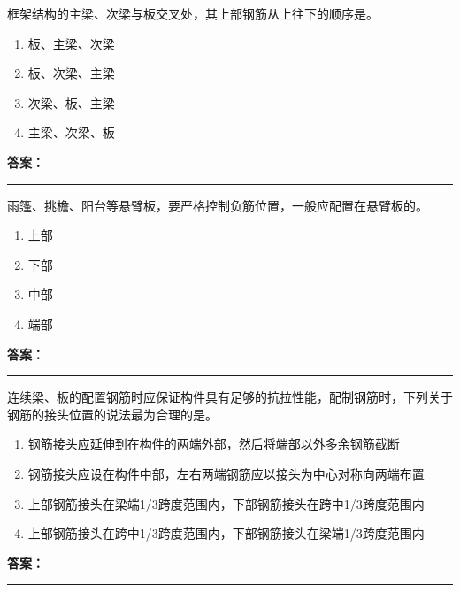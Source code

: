 \documentclass[UTF8,fontset=fandol,11pt]{ctexart}
\newcommand{\answerline}{\textcolor{answerred}{\rule{2.4cm}{0.7pt}}}
\begin{document}
\vspace{0.2em}

\begin{quizbox}[title={第 26 题}]
框架结构的主梁、次梁与板交叉处，其上部钢筋从上往下的顺序是。\\
\begin{enumerate}[label=\Alph*.]
\item 板、主梁、次梁
\item 板、次梁、主梁
\item 次梁、板、主梁
\item 主梁、次梁、板
\end{enumerate}
\textbf{\textcolor{answerred}{答案：}} \answerline
\end{quizbox}

\vspace{0.2em}

\begin{quizbox}[title={第 27 题}]
雨篷、挑檐、阳台等悬臂板，要严格控制负筋位置，一般应配置在悬臂板的。\\
\begin{enumerate}[label=\Alph*.]
\item 上部
\item 下部
\item 中部
\item 端部
\end{enumerate}
\textbf{\textcolor{answerred}{答案：}} \answerline
\end{quizbox}

\vspace{0.2em}

\begin{quizbox}[title={第 28 题}]
连续梁、板的配置钢筋时应保证构件具有足够的抗拉性能，配制钢筋时，下列关于钢筋的接头位置的说法最为合理的是。\\
\begin{enumerate}[label=\Alph*.]
\item 钢筋接头应延伸到在构件的两端外部，然后将端部以外多余钢筋截断
\item 钢筋接头应设在构件中部，左右两端钢筋应以接头为中心对称向两端布置
\item 上部钢筋接头在梁端1/3跨度范围内，下部钢筋接头在跨中1/3跨度范围内
\item 上部钢筋接头在跨中1/3跨度范围内，下部钢筋接头在梁端1/3跨度范围内
\end{enumerate}
\textbf{\textcolor{answerred}{答案：}} \answerline
\end{quizbox}

\vspace{0.2em}
\end{document}
